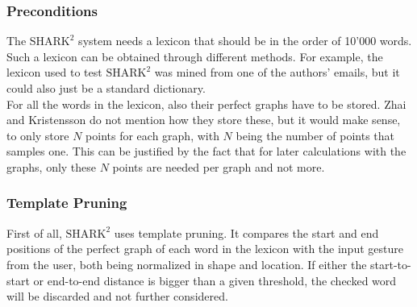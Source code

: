 \subsubsection{Preconditions}
The $\text{SHARK}^2$ system needs a lexicon that should be in the order of 10'000 words. Such a lexicon can be obtained through different methods. For example, the lexicon used to test $\text{SHARK}^2$ was mined from one of the authors' emails, but it could also just be a standard dictionary.\\
For all the words in the lexicon, also their perfect graphs have to be stored. Zhai and Kristensson \cite{Kristensson2004SHARK2AL} do not mention how they store these, but it would make sense, to only store $N$ points for each graph, with $N$ being the number of points that samples one. This can be justified by the fact that for later calculations with the graphs, only these $N$ points are needed per graph and not more.

\subsubsection{Template Pruning}
First of all, $\text{SHARK}^2$ uses template pruning. It compares the start and end positions of the perfect graph of each word in the lexicon with the input gesture from the user, both being normalized in shape and location. If either the start-to-start or end-to-end distance is bigger than a given threshold, the checked word will be discarded and not further considered.

